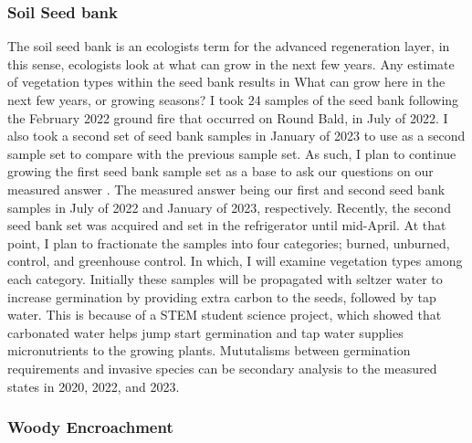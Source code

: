 \documentclass[
]{article}
\begin{document}
\hypertarget{soil-seed-bank}{%
\subsubsection{Soil Seed bank}\label{soil-seed-bank}}

The soil seed bank is an ecologists term for the advanced regeneration layer, in this sense, ecologists look at what can grow in the next few years. Any estimate of vegetation types within the seed bank results in What can grow here in the next few years, or growing seasons? I took 24 samples of the seed bank following the February 2022 ground fire that occurred on Round Bald, in July of 2022. I also took a second set of seed bank samples in January of 2023 to use as a second sample set to compare with the previous sample set. As such, I plan to continue growing the first seed bank sample set as a base to ask our questions on our measured answer . The measured answer being our first and second seed bank samples in July of 2022 and January of 2023, respectively. Recently, the second seed bank set was acquired and set in the refrigerator until mid-April. At that point, I plan to fractionate the samples into four categories; burned, unburned, control, and greenhouse control. In which, I will examine vegetation types among each category. Initially these samples will be propagated with seltzer water to increase germination by providing extra carbon to the seeds, followed by tap water. This is because of a STEM student science project, which showed that carbonated water helps jump start germination and tap water supplies micronutrients to the growing plants. Mututalisms between germination requirements and invasive species can be secondary analysis to the measured states in 2020, 2022, and 2023.

\hypertarget{woody-encroachment}{%
\subsubsection{Woody Encroachment}\label{woody-encroachment}}
\end{document}
